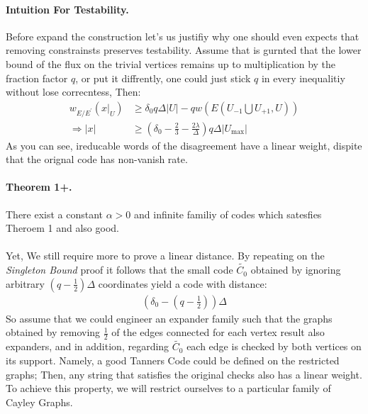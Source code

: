 \documentclass{article}
\begin{document}
\begin{multicols*}{2}
 \paragraph{Intuition For Testability.} Before expand the construction let's us justifiy why one should even expects that removing constrainsts preserves testability. Assume that is gurnted that the lower bound of the flux on the trivial vertices remains up to multiplication by the fraction factor $q$, or put it diffrently, one could just stick $q$ in every inequalitiy without lose correcntess, Then: 
  \begin{equation*}
    \begin{split}
      w_{E/E^{\prime}}\left( x|_{U} \right) & \ge  \delta_{0}q\Delta|U| -qw\left( E(U_{-1} \bigcup U_{+1} ,U)  \right) \\ 
      \Rightarrow |x| & \ge \left(  \delta_{0} - \frac{2}{3} - \frac{2\lambda}{\Delta} \right) q \Delta|U_{\max}|
    \end{split}
  \end{equation*}
  As you can see, ireducable words of the disagreement have a linear weight, dispite that the orignal code has non-vanish rate.     
  
  \paragraph{Theorem 1+.} There exist a constant $\alpha > 0 $ and infinite familiy of codes which satesfies Theroem 1 and also good.
  \paragraph{}

  Yet, We still require more to prove a linear distance. 
   By repeating on the \emph{Singleton Bound} proof it follows that the small code $\tilde{C_{0}}$ obtained by ignoring arbitrary $ \left( q - \frac{1}{2} \right) \Delta $ coordinates yield a code with distance: 
  \begin{equation*}
    \begin{split}
      \left( \delta_{0} - \left( q - \frac{1}{2} \right) \right)\Delta
    \end{split}
  \end{equation*}
  So assume that we could engineer an expander family such that the graphs obtained by removing $\frac{1}{2}$ of the edges connected for each vertex result also expanders, and in addition, regarding $\tilde{C_{0}}$ each edge is checked by both vertices on its support. Namely, a good Tanners Code could be defined on the restricted graphs; Then, any string that satisfies the original checks also has a linear weight. To achieve this property, we will restrict ourselves to a particular family of Cayley Graphs.  

\end{multicols*}
\end{document}
